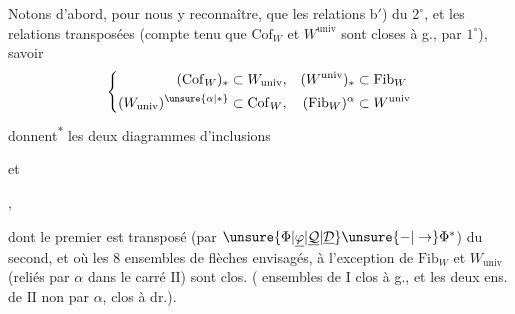 
Notons d'abord, pour nous y reconnaître,
que les relations b$'$) du $2^\circ$, et les
relations transposées (compte tenu que $\mathrm{Cof}_W$
et $W^{\mathrm{univ}}$ sont closes à g., par $1^\circ$), 
savoir
\[
 \left\{\begin{aligned}
 (\mathrm{Cof}_W)_*&\subset W_{\mathrm{univ}},&
 (W^{\mathrm{univ}})_*&\subset\mathrm{Fib}_W\\
 (W_{\mathrm{univ}})^{\unsure{\alpha|*}}&\subset\mathrm{Cof}_W,&
 (\mathrm{Fib}_W)^{\alpha}&\subset W^{\mathrm{univ}}
 \end{aligned}\right.
\]
donnent\textsuperscript{$*$} les deux diagrammes  d'inclusions


et

,

dont le premier est transposé (par $\unsure{\Phi|\underline{\varphi}|\underline{\mathcal{Q}}|\underline{\mathcal{D}}}\unsure{-|\to}\Phi^*$)
du second, et où les 8 ensembles de
flèches envisagés, à l'exception de $\mathrm{Fib}_W$ et
$W_{\mathrm{univ}}$ (reliés par $\alpha$ dans le carré $\mathrm{II}$)
sont clos. (  ensembles de
$\mathrm I$ clos à g., et les deux ens. de $\mathrm{II}$
non  par $\alpha$, clos à dr.).
